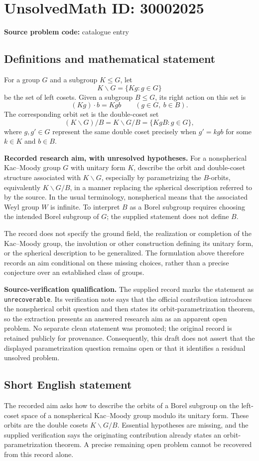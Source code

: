 \documentclass[11pt]{article}
\begin{document}
\section*{UnsolvedMath ID: 30002025}
\textbf{Source problem code:} catalogue entry
\subsection{Definitions and mathematical statement}
For a group \(G\) and a subgroup \(K\leq G\), let
\[
K\backslash G=\{Kg:g\in G\}
\]
be the set of left cosets. Given a subgroup \(B\leq G\), its right action on this set is
\[
(Kg)\cdot b=Kgb\qquad(g\in G,\ b\in B).
\]
The corresponding orbit set is the double-coset set
\[
(K\backslash G)/B=K\backslash G/B
=\{KgB:g\in G\},
\]
where \(g,g'\in G\) represent the same double coset precisely when \(g'=kgb\) for some \(k\in K\) and \(b\in B\).

\textbf{Recorded research aim, with unresolved hypotheses.} For a nonspherical Kac--Moody group \(G\) with unitary form \(K\), describe the orbit and double-coset structure associated with \(K\backslash G\), especially by parametrizing the \(B\)-orbits, equivalently \(K\backslash G/B\), in a manner replacing the spherical description referred to by the source. In the usual terminology, nonspherical means that the associated Weyl group \(W\) is infinite. To interpret \(B\) as a Borel subgroup requires choosing the intended Borel subgroup of \(G\); the supplied statement does not define \(B\).

The record does not specify the ground field, the realization or completion of the Kac--Moody group, the involution or other construction defining its unitary form, or the spherical description to be generalized. The formulation above therefore records an aim conditional on these missing choices, rather than a precise conjecture over an established class of groups.

\textbf{Source-verification qualification.} The supplied record marks the statement as \texttt{unrecoverable}. Its verification note says that the official contribution introduces the nonspherical orbit question and then states its orbit-parametrization theorem, so the extraction presents an answered research aim as an apparent open problem. No separate clean statement was promoted; the original record is retained publicly for provenance. Consequently, this draft does not assert that the displayed parametrization question remains open or that it identifies a residual unsolved problem.
\subsection{Short English statement}
The recorded aim asks how to describe the orbits of a Borel subgroup on the left-coset space of a nonspherical Kac--Moody group modulo its unitary form. These orbits are the double cosets \(K\backslash G/B\). Essential hypotheses are missing, and the supplied verification says the originating contribution already states an orbit-parametrization theorem. A precise remaining open problem cannot be recovered from this record alone.
\end{document}
